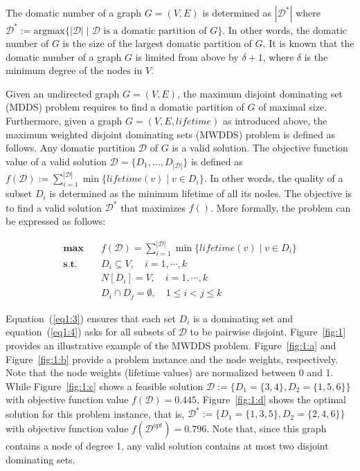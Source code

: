 \documentclass[algorithms,article,accept,moreauthors,pdftex]{Definitions/mdpi}
\begin{document}
\begin{Definition}
The domatic number of a graph $G=(V,E)$ is determined as $|\mathcal{D}^*|$ where $\mathcal{D}^* := \mbox{argmax}\{|\mathcal{D}| \mid \mathcal{D} \mbox{ is a domatic partition of } G\}$. In other words, the domatic number of $G$ is the size of the largest domatic partition of $G$. It is known that the domatic number of a graph $G$ is limited from above by $ \delta +1$, where $\delta$ is the minimum degree of the nodes in $V$.
\end{Definition}  

Given an undirected graph $G=(V,E)$, the maximum disjoint dominating set (MDDS) problem requires to find a domatic partition of $G$ of maximal size. Furthermore, given a graph $G =(V,E, lifetime)$ as introduced above, the maximum weighted disjoint dominating sets (MWDDS) problem is defined as follows. Any domatic partition $\mathcal{D}$ of $G$ is a valid solution. The objective function value of a valid solution $\mathcal{D} = \{D_1,\ldots,D_{|\mathcal{D}|}\}$ is defined as $f(\mathcal{D}) := \sum_{i=1}^{|\mathcal{D}|} \min \{lifetime(v) \mid v \in D_i\}$. In other words, the quality of a subset $D_i$ is determined as the minimum lifetime of all its nodes. The objective is to find a valid solution $\mathcal{D}^*$ that maximizes $f()$. More formally, the problem can be expressed as follows:
 
 \begin{align}
       \textbf{max}     \quad  & f(\mathcal{D}) = \sum_{i=1}^{|\mathcal{D}|} \min\{lifetime(v) \mid v \in D_i\} \label{eq1:1} \\ 
       \textbf{s.t.}    \quad  & D_i \subseteq V,  \quad   i= 1,\cdots,k \label{eq1:2}    \\ 
                        \quad  & N[D_i] = V,    \quad   i= 1,\cdots,k \label{eq1:3}    \\ 
                        \quad  & D_{i} \cap  D_{j} = \emptyset,   \quad  1 \leq i < j \leq k  \label{eq1:4} 
\end{align}

Equation~(\ref{eq1:3}) ensures that each set $D_i$ is a dominating set and equation~(\ref{eq1:4}) asks for all subsets of $\mathcal{D}$ to be pairwise disjoint. Figure~\ref{fig:1} provides an illustrative example of the MWDDS problem. Figure~\ref{fig:1:a}  and Figure~\ref{fig:1:b} provide a problem instance and the node weights, respectively. Note that the node weights (lifetime values) are normalized between 0 and 1. While Figure~\ref{fig:1:c} shows a feasible solution $\mathcal{D}:=\{ D_1 =\{3,4\}, D_2=\{1,5,6\}\} $ with objective function value $f(\mathcal{D}) =0.445$, Figure~\ref{fig:1:d} shows the optimal solution for this problem instance, that is,  $\mathcal{D}^*:=\{ D_1 =\{1,3,5\}, D_2=\{2,4,6\}\} $ with objective function value $f(\mathcal{D}^{opt}) =0.796$. Note that, since this graph contains a node of degree 1, any valid solution contains at most two disjoint dominating sets.
\end{document}
